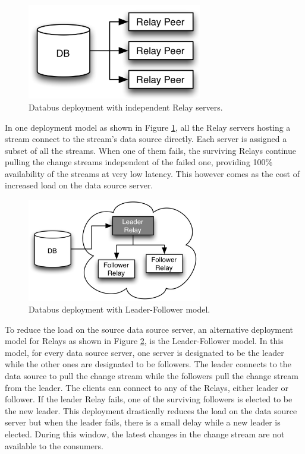\documentclass[conference]{IEEEtran}
\begin{document}
\begin{figure}[!htbp]
\centering
\includegraphics[width=3in]{jpeg/relay-direct}
\caption{Databus deployment with independent Relay servers.}
\label{relay-direct}
\end{figure}

In one deployment model as shown in Figure \ref{relay-direct}, all the Relay servers hosting a stream connect to the stream's data source directly. Each server is assigned a subset of all the streams. When one of them fails, the surviving Relays continue pulling the change
streams independent of the failed one, providing 100\% availability of the streams at very low latency. This however comes as the cost of increased load on the data source server.

\begin{figure}[!htbp]
\centering
\includegraphics[width=3in]{jpeg/relay-leader-follower}
\caption{Databus deployment with Leader-Follower model.}
\label{relay-leader-follower}
\end{figure}

To reduce the load on the source data source server, an alternative deployment model for Relays as shown in Figure \ref{relay-leader-follower}, is the Leader-Follower model. In this model, for every data source server, one server is designated to be the leader while the other ones are designated to be followers. The leader connects to the data source to pull the change stream while the followers pull the change stream from the leader. The clients can connect to any of the Relays, either leader or follower. If the leader Relay fails, one of the surviving followers is elected to be the new leader. This deployment drastically reduces the load on the data source server but when the leader fails, there is a small delay while a new leader is elected. During this window, the latest changes in the change stream  are not available to the consumers.
\end{document}
